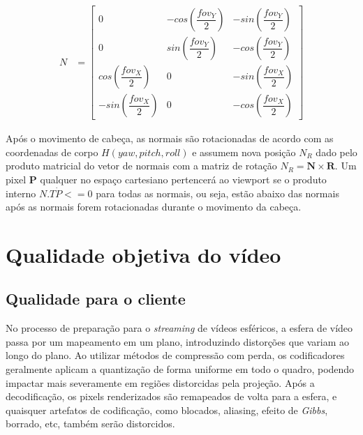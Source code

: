 \begin{align}
N &=\begin{bmatrix}
     0 & -cos\left(\dfrac{fov_Y}{2}\right) & -sin\left(\dfrac{fov_Y}{2}\right) \\
     0 & sin\left(\dfrac{fov_Y}{2}\right) & -cos\left(\dfrac{fov_Y}{2}\right) \\
     cos\left(\dfrac{fov_X}{2}\right) & 0 & -sin\left(\dfrac{fov_X}{2}\right)\\
     -sin\left(\dfrac{fov_X}{2}\right) & 0 & -cos\left(\dfrac{fov_X}{2}\right)
\end{bmatrix}
\label{eq:normals}
\end{align}

Após o movimento de cabeça, as normais são rotacionadas de acordo com as coordenadas de corpo $H(yaw, pitch, roll)$ e assumem nova posição $ N_R $ dado pelo produto matricial do vetor de normais com a matriz de rotação $ N_R = \textbf{N} \times \textbf{R}$. Um pixel $ \textbf{P}$ qualquer no espaço cartesiano pertencerá ao viewport se o produto interno $ N.T \dot P <=0 $ para todas as normais, ou seja, estão abaixo das normais após as normais forem rotacionadas durante o movimento da cabeça.

\section{Qualidade objetiva do vídeo}

\subsection{Qualidade para o cliente}
No processo de preparação para o \textit{streaming} de vídeos esféricos, a esfera de vídeo passa por um mapeamento em um plano, introduzindo distorções que variam ao longo do plano. Ao utilizar métodos de compressão com perda, os codificadores geralmente aplicam a quantização de forma uniforme em todo o quadro, podendo impactar mais severamente em regiões distorcidas pela projeção. Após a decodificação, os pixels renderizados são remapeados de volta para a esfera, e quaisquer artefatos de codificação, como blocados, aliasing, efeito de \textit{Gibbs}, borrado, etc, também serão distorcidos.

